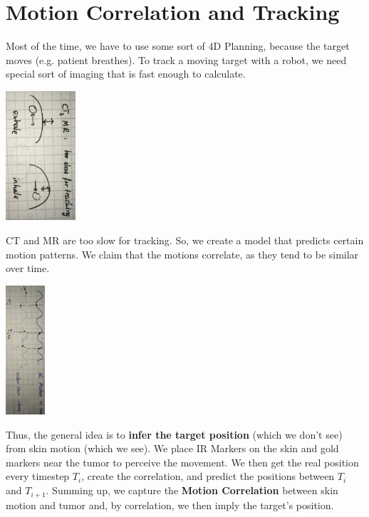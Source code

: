 \documentclass{exerciseBlue}
\begin{document}
\section{Motion Correlation and Tracking}
Most of the time, we have to use some sort of 4D Planning, because the target moves (e.g. patient breathes). To track a moving target with a robot, we need special sort of imaging that is fast enough to calculate.
\begin{center}
	\includegraphics[height = 4.8cm]{Images/Tracking}
\end{center}
CT and MR are too slow for tracking. So, we create a model that predicts certain motion patterns. We claim that the motions correlate, as they tend to be similar over time.
\begin{center}
	\includegraphics[height = 4.8cm]{Images/Correlation}
\end{center}
Thus, the general idea is to \textbf{infer the target position} (which we don't see) from skin motion (which we see). We place IR Markers on the skin and gold markers near the tumor to perceive the movement. We then get the real position every timestep $T_i$, create the correlation, and predict the positions between $T_i$ and $T_{i+1}$. Summing up, we capture the \textbf{Motion Correlation} between skin motion and tumor and, by correlation, we then imply the target's position.
\newpage
\end{document}
